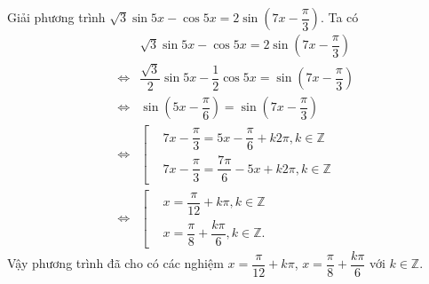\begin{bt}%
 Giải phương trình $\sqrt{3}\sin 5x-\cos 5x=2\sin\left(7x-\dfrac{\pi}{3}\right)$.
 \loigiai
  {
  Ta có
  \allowdisplaybreaks
  \begin{eqnarray*}
   && \sqrt{3}\sin 5x-\cos 5x=2\sin\left(7x-\dfrac{\pi}{3}\right) \\
   &\Leftrightarrow & \dfrac{\sqrt{3}}{2}\sin5x-\dfrac{1}{2}\cos5x=\sin\left(7x-\dfrac{\pi}{3}\right)\\
   &\Leftrightarrow & \sin\left(5x-\dfrac{\pi}{6}\right)=\sin\left(7x-\dfrac{\pi}{3}\right)\\
   &\Leftrightarrow & \left[\begin{aligned}&7x-\dfrac{\pi}{3}=5x-\dfrac{\pi}{6}+k2\pi,k\in\mathbb{Z}	\\&7x-\dfrac{\pi}{3}=\dfrac{7\pi}{6}-5x+k2\pi,k\in\mathbb{Z}\end{aligned}\right.\\
   &\Leftrightarrow& \left[\begin{aligned}&x=\dfrac{\pi}{12}+k\pi,k\in\mathbb{Z}	\\&x=\dfrac{\pi}{8}+\dfrac{k\pi}{6},k\in\mathbb{Z}.\end{aligned}\right.
  \end{eqnarray*}
  Vậy phương trình đã cho có các nghiệm $x=\dfrac{\pi}{12}+k\pi$, $x=\dfrac{\pi}{8}+\dfrac{k\pi}{6}$ với $k\in\mathbb{Z}$.
  }
\end{bt}

